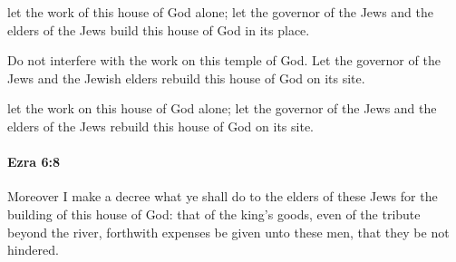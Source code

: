 			\begin{versebox}
					\item[BHS] 
					\item[LXX] 
					\item[ASV] let the work of this house of God alone; let the governor of the Jews and the elders of the Jews build this house of God in its place.
					\item[NIV] Do not interfere with the work on this temple of God. Let the governor of the Jews and the Jewish elders rebuild this house of God on its site.
					\item[NRSV] let the work on this house of God alone; let the governor of the Jews and the elders of the Jews rebuild this house of God on its site.
			\end{versebox}

		\paragraph{Ezra 6:8} %
			\label{EZRA-6-8}

			Moreover I make a decree what ye shall do to the elders of these Jews for the building of this house of God: that of the king’s goods, even of the tribute beyond the river, forthwith expenses be given unto these men, that they be not hindered.

